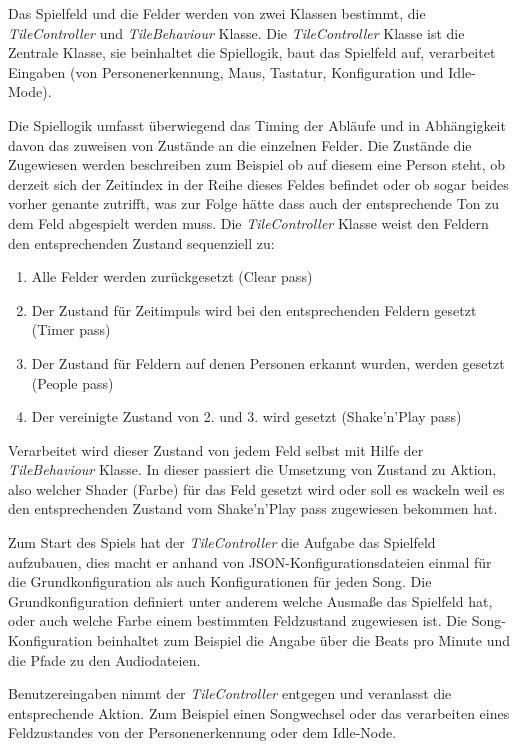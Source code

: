 \label{sec:tiles}

Das Spielfeld und die Felder werden von zwei Klassen bestimmt, die \emph{TileController} und \emph{TileBehaviour} Klasse. 
Die \emph{TileController} Klasse ist die Zentrale Klasse, sie beinhaltet die Spiellogik, baut das Spielfeld auf, verarbeitet Eingaben (von Personenerkennung, Maus, Tastatur, Konfiguration und Idle-Mode).

Die Spiellogik umfasst überwiegend das Timing der Abläufe und in Abhängigkeit davon das zuweisen von Zustände an die einzelnen Felder. Die Zustände die Zugewiesen werden beschreiben zum Beispiel ob auf diesem eine Person steht, ob derzeit sich der Zeitindex in der Reihe dieses Feldes befindet oder ob sogar beides vorher genante zutrifft, was zur Folge hätte dass auch der entsprechende Ton zu dem Feld abgespielt werden muss. Die \emph{TileController} Klasse weist den Feldern den entsprechenden Zustand sequenziell zu:
\begin{enumerate}
\item Alle Felder werden zurückgesetzt (Clear pass)
\item Der Zustand für Zeitimpuls wird bei den entsprechenden Feldern gesetzt (Timer pass)
\item Der Zustand für Feldern auf denen Personen erkannt wurden, werden gesetzt (People pass)
\item Der vereinigte Zustand von 2. und 3. wird gesetzt (Shake'n'Play pass)
\end{enumerate}
Verarbeitet wird dieser Zustand von jedem Feld selbst mit Hilfe der \emph{TileBehaviour} Klasse. In dieser passiert die Umsetzung von Zustand zu Aktion, also welcher Shader (Farbe) für das Feld gesetzt wird oder soll es wackeln weil es den entsprechenden Zustand vom Shake'n'Play pass zugewiesen bekommen hat.

Zum Start des Spiels hat der \emph{TileController} die Aufgabe das Spielfeld aufzubauen, dies macht er anhand von JSON-Konfigurationsdateien einmal für die Grundkonfiguration als auch Konfigurationen für jeden Song. Die Grundkonfiguration definiert unter anderem welche Ausmaße das Spielfeld hat, oder auch welche Farbe einem bestimmten Feldzustand zugewiesen ist. Die Song-Konfiguration beinhaltet zum Beispiel die Angabe über die Beats pro Minute und die Pfade zu den Audiodateien.

Benutzereingaben nimmt der \emph{TileController} entgegen und veranlasst die entsprechende Aktion. Zum Beispiel einen Songwechsel oder das verarbeiten eines Feldzustandes von der Personenerkennung oder dem Idle-Node.


